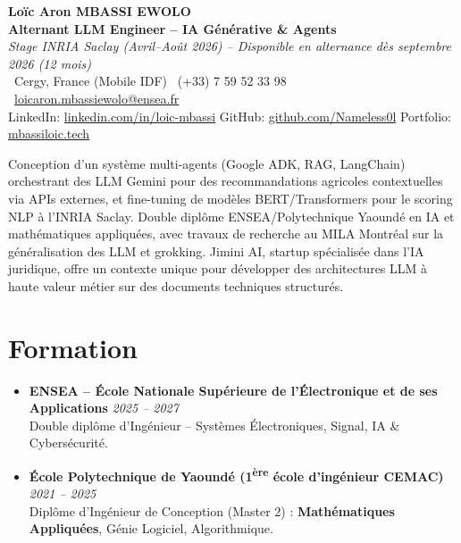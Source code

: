 \documentclass[a4paper,11pt]{article}
\begin{document}
\begin{center}
    {\Large \textbf{Lo\"ic Aron MBASSI EWOLO}} \\ \vspace{4pt}
    \textbf{\large Alternant LLM Engineer -- IA G\'enérative \& Agents} \\
    \textit{\small Stage INRIA Saclay (Avril--Ao\^ut 2026) -- Disponible en alternance d\`es septembre 2026 (12 mois)} \\ \vspace{4pt}
    \small
    \Pointinghand\ Cergy, France (Mobile IDF) \quad \Mobilefone\ (+33) 7 59 52 33 98 \quad
    {\color{primary}\Letter\ \href{mailto:loicaron.mbassiewolo@ensea.fr}{loicaron.mbassiewolo@ensea.fr}} \\ \vspace{2pt}
    {\color{primary}LinkedIn: \href{https://www.linkedin.com/in/loic-mbassi/}{linkedin.com/in/loic-mbassi}} \quad
    {\color{primary}GitHub: \href{https://github.com/Nameless0l}{github.com/Nameless0l}} \quad
    {\color{primary}Portfolio: \href{https://mbassiloic.tech}{mbassiloic.tech}}
\end{center}
\vspace{-6pt}
\noindent\small{Conception d'un syst\`eme multi-agents (Google ADK, RAG, LangChain) orchestrant des LLM Gemini pour des recommandations agricoles contextuelles via APIs externes, et fine-tuning de mod\`eles BERT/Transformers pour le scoring NLP à l'INRIA Saclay. Double diplôme ENSEA/Polytechnique Yaoundé en IA et mathématiques appliquées, avec travaux de recherche au MILA Montréal sur la généralisation des LLM et grokking. Jimini AI, startup spécialisée dans l'IA juridique, offre un contexte unique pour développer des architectures LLM à haute valeur métier sur des documents techniques structurés.}

\section{Formation}
\begin{itemize}[leftmargin=*, label=\tiny$\bullet$, nosep]
    \item \textbf{ENSEA -- \'Ecole Nationale Sup\'erieure de l'\'Electronique et de ses Applications} \hfill \textit{2025 -- 2027} \\
    \small{Double dipl\^ome d'Ing\'enieur -- Syst\`emes \'Electroniques, Signal, IA \& Cybersécurité.}
    \item \textbf{\'Ecole Polytechnique de Yaound\'e (1\textsuperscript{\`ere} \'ecole d'ing\'enieur CEMAC)} \hfill \textit{2021 -- 2025} \\
    \small{Dipl\^ome d'Ing\'enieur de Conception (Master 2) : \textbf{Math\'ematiques Appliqu\'ees}, G\'enie Logiciel, Algorithmique.}
\end{itemize}
\end{document}
